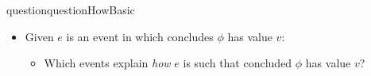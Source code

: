\begin{note}
  \begin{restatable}[\qHow{}]{question}{questionHowBasic}
    \label{q:how}
    \begin{itemize}
    \item
      Given \(e\) is an event in which \vAgent{} concludes \(\phi\) has value \(v\):
      \begin{itemize}
      \item
        Which events explain \emph{how} \(e\) is such that \vAgent{} concluded \(\phi\) has value \(v\)?
      \end{itemize}
    \end{itemize}
    \vspace{-\baselineskip}
  \end{restatable}
\end{note}

